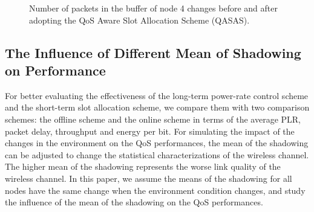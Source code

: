 \documentclass[journal,10pt]{IEEEtran}
\begin{document}
\begin{figure}[!htb]
\centering
    \hspace{-0.1cm}
\caption{Number of packets in the buffer of node 4 changes before and after adopting the QoS Aware Slot Allocation Scheme (QASAS).}
\label{fig:cp_Packets}
\end{figure}


\subsection{The Influence of Different Mean of Shadowing on Performance}
For better evaluating the effectiveness of the long-term power-rate control scheme and the short-term slot allocation scheme, we compare them with two comparison schemes: the offline scheme \cite{huang2014optimal} and the online scheme \cite{ibarra2016qos} in terms of the average PLR, packet delay, throughput and energy per bit. For simulating the impact of the changes in the environment on the QoS performances, the mean of the shadowing can be adjusted to change the statistical characterizations of the wireless channel. The higher mean of the shadowing represents the worse link quality of the wireless channel. In this paper, we assume the means of the shadowing for all nodes have the same change when the environment condition changes, and study the influence of the mean of the shadowing on the QoS performances. 
\end{document}
